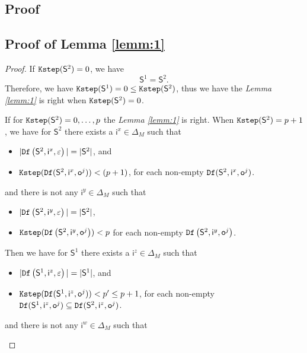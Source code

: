 \begin{appendices}
\section{Proof}
\label{sec:pro}
\subsection{Proof of Lemma \ref{lemm:1}}
\begin{proof}
If ${\tt Kstep}(\mathsf{S}^{2})=0$, we have  \[\mathsf{S}^{1} = \mathsf{S}^{2}.\] Therefore, we have ${\tt Kstep}(\mathsf{S}^{1})=0\le{\tt Kstep}(\mathsf{S}^{2})$, thus we have the {\em Lemma \ref{lemm:1}} is right when ${\tt Kstep}(\mathsf{S}^{2})=0$.
 
 If for ${\tt Kstep}(\mathsf{S}^{2})=0,\ldots, p$ the {\em Lemma \ref{lemm:1}} is right. When ${\tt Kstep}(\mathsf{S}^{2})=p+1$, we have for $\mathsf{S}^{2}$ there exists a $\mathsf{i}^{x}\in \Delta_M$ such that
 \begin{itemize}
 \item  $|{\tt Df}\left(\mathsf{S}^{2},\mathsf{i}^{x},\varepsilon\right)|=|\mathsf{S}^{2}|$, and 
 \item  ${\tt Kstep}({\tt Df}(\mathsf{S}^{2},\mathsf{i}^{x},\mathsf{o}^{j}))<(p+1)$, for each non-empty ${\tt Df}(\mathsf{S}^{2},\mathsf{i}^{x},\mathsf{o}^{j})$.
 \end{itemize}
 and there is not any $\mathsf{i}^{y} \in \Delta_M$ such that
  \begin{itemize}
 \item  $|{\tt Df}\left(\mathsf{S}^{2},\mathsf{i}^{y},\varepsilon\right)|=|\mathsf{S}^2|$,
 \item  ${\tt Kstep}({\tt Df}\left(\mathsf{S}^{2},\mathsf{i}^{y},\mathsf{o}^{j}\right))< p$ for each non-empty ${\tt Df}\left(\mathsf{S}^{2},\mathsf{i}^{y},\mathsf{o}^{j}\right)$.
 \end{itemize} 
 Then we have for $\mathsf{S}^{1}$ there exists a $\mathsf{i}^{z}\in \Delta_M$ such that
 \begin{itemize}
 \item  $|{\tt Df}\left(\mathsf{S}^{1},\mathsf{i}^{z},\varepsilon\right)|=|\mathsf{S}^{1}|$, and 
 \item  ${\tt Kstep}({\tt Df}(\mathsf{S}^{1},\mathsf{i}^{z},\mathsf{o}^{j}))<p'\le p+1$, for each non-empty ${\tt Df}(\mathsf{S}^{1},\mathsf{i}^{z},\mathsf{o}^{j})\subseteq {\tt Df}(\mathsf{S}^{2},\mathsf{i}^{z},\mathsf{o}^{j})$.
 \end{itemize}
 and there is not any $\mathsf{i}^{w} \in \Delta_M$ such that
  \begin{itemize}

\end{itemize}
\end{proof}
\end{appendices}
